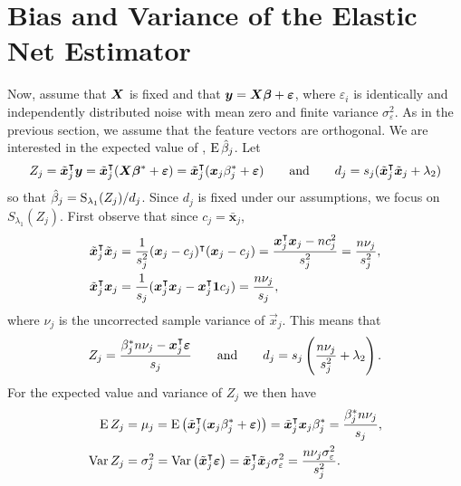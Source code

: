 \section{Bias and Variance of the Elastic Net Estimator}\label{sec:theory}

Now, assume that \(\boldsymbol{X}\) is fixed and that \(\boldsymbol{y} = \boldsymbol{X}\boldsymbol{\beta} +
\boldsymbol{\varepsilon}\), where \(\varepsilon_i\) is identically and independently distributed
noise with mean zero and finite variance \(\sigma_\varepsilon^2\). As in the previous
section, we assume that the feature vectors are orthogonal. We are interested in the
expected value of , \(\operatorname{E} \hat{\beta}_j\). Let
\[
  {Z_j} = \tilde{\boldsymbol{x}}_j^\intercal \boldsymbol{y} = \tilde{\boldsymbol{x}}_j^\intercal(\boldsymbol{X}\boldsymbol{\beta}^* + \boldsymbol{\varepsilon}) = \tilde{\boldsymbol{x}}_j^\intercal (\boldsymbol{x}_j\beta_j^* + \boldsymbol{\varepsilon})
  \qquad
  \text{and}
  \qquad
  d_j = s_j(\tilde{\boldsymbol{x}}_j^\intercal \tilde{\boldsymbol{x}}_j + \lambda_2)
\]
so that \(\hat{\beta}_j = \operatorname{S}_{\lambda_1}({Z_j})/d_j\). Since \(d_j\) is fixed under our
assumptions, we focus on \(S_{\lambda_1}({Z_j})\). First observe that since \(c_j =
\bar{\bm{x}}_j\),
\[
  \begin{aligned}
    \tilde{\boldsymbol{x}}_j^\intercal \tilde{\boldsymbol{x}}_j & = \frac{1}{s_j^2}(\boldsymbol{x}_j - c_j)^\intercal (\boldsymbol{x}_j - c_j) = \frac{\boldsymbol{x}_j^\intercal\boldsymbol{x}_j - nc_j^2}{s^2_j} = \frac{n \nu_j}{s_j^2}, \\
    \tilde{\boldsymbol{x}}_j^\intercal \boldsymbol{x}_j         & = \frac{1}{s_j}(\boldsymbol{x}_j^\intercal \boldsymbol{x}_j - \boldsymbol{x}_j^\intercal \boldsymbol{1} c_j) = \frac{n \nu_j}{s_j},
  \end{aligned}
\]
where \(\nu_j\) is the uncorrected sample variance of \(\vec{x}_j\). This means that
\begin{equation}
  \label{eq:z-d}
  {Z_j} = \frac{\beta_j^* n \nu_j- \boldsymbol{x}_j^\intercal \boldsymbol{\varepsilon}}{s_j}
  \qquad\text{and}\qquad
  d_j = s_j\left(\frac{n \nu_j}{s_j^2} + \lambda_2\right).
\end{equation}
For the expected value and variance of \({Z_j}\) we then have
\begin{align*}
  \operatorname{E} {Z_j}   & = \mu_j = \operatorname{E} \left( \tilde{\boldsymbol{x}}_j^\intercal (\boldsymbol{x}_j\beta^*_j + \boldsymbol{\varepsilon}) \right)  = \tilde{\boldsymbol{x}}_j^\intercal\boldsymbol{x}_j \beta^*_j = \frac{\beta_j^* n \nu_j}{s_j},            \\
  \operatorname{Var} {Z_j} & = \sigma_j^2 = \operatorname{Var}\left(\tilde{\boldsymbol{x}}_j ^\intercal \boldsymbol{\varepsilon}\right) = \tilde{\boldsymbol{x}}_j^\intercal \tilde{\boldsymbol{x}}_j\sigma_\varepsilon^2 = \frac{n\nu_j\sigma_\varepsilon^2}{s_j^2}.
\end{align*}

